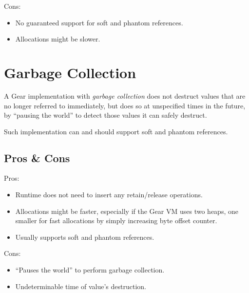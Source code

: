 Cons:
\begin{itemize}
  \item No guaranteed support for soft and phantom references. 
  \item Allocations might be slower. 
\end{itemize}





\section{Garbage Collection}
\label{sec:gc-memory-model}

A Gear implementation with {\em garbage collection} does not destruct values that are no longer referred to immediately, but does so at unspecified times in the future, by ``pausing the world'' to detect those values it can safely destruct. 

Such implementation can and should support soft and phantom references. 







\subsection{Pros \& Cons}

Pros:
\begin{itemize}
  \item Runtime does not need to insert any retain/release operations. 
  \item Allocations might be faster, especially if the Gear VM uses two heaps, one smaller for fast allocations by simply increasing byte offset counter. 
  \item Usually supports soft and phantom references. 
\end{itemize}

Cons:
\begin{itemize}
  \item ``Pauses the world'' to perform garbage collection.
  \item Undeterminable time of value's destruction. 
\end{itemize}






